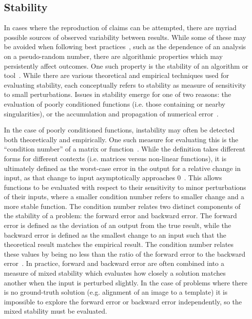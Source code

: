 \subsection{Stability}
In cases where the reproduction of claims can be attempted, there are myriad possible sources of observed variability
between results. While some of these may be avoided when following best practices~\cite{prlic2012ten},
such as the dependence of an analysis on a pseudo-random number, there are algorithmic properties which may
persistently affect outcomes. One such property is the stability of an algorithm or tool~\cite{higham2002accuracy}.
While there are various theoretical and empirical techniques used for evaluating stability, each conceptually refers to
stability as measure of sensitivity to small perturbations. Issues in stability emerge for one of two reasons: the
evaluation of poorly conditioned functions (i.e. those containing or nearby singularities), or the accumulation and
propagation of numerical error~\cite{higham2002accuracy}.

In the case of poorly conditioned functions, instability may often be detected both theoretically and empirically. One
such measure for evaluating this is the ``condition number'' of a matrix or function~\cite{belsley2005regression}. While
the definition takes different forms for different contexts (i.e. matrices versus non-linear functions), it is
ultimately defined as the worst-case error in the output for a relative change in input, as that change to input
asymptotically approaches $0$~\cite{belsley2005regression}. This allows functions to be evaluated with respect to
their sensitivity to minor perturbations of their inputs, where a smaller condition number refers to smaller change and
a more stable function. The condition number relates two distinct components of the stability of a problem: the forward
error and backward error. The forward error is defined as the deviation of an output from the true result, while the
backward error is defined as the smallest change to an input such that the theoretical result matches the empirical
result. The condition number relates these values by being no less than the ratio of the forward error to the backward
error~\cite{belsley2005regression}. In practice, forward and backward error are often combined into a measure of mixed
stability which evaluates how closely a solution matches another when the input is perturbed slightly. In the case of
problems where there is no ground-truth solution (e.g. alignment of an image to a template) it is impossible to explore
the forward error or backward error independently, so the mixed stability must be evaluated.

